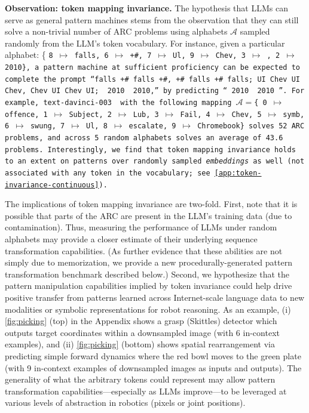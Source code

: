 \textbf{Observation: token mapping invariance.} The hypothesis that LLMs can serve as general pattern machines stems from the observation that they can still solve a non-trivial number of ARC problems using alphabets $\mathcal{A}$ sampled randomly from the LLM's token vocabulary. For instance, given a particular alphabet: 
\{
\tt{8} $\mapsto$ \tt{falls},
\tt{6} $\mapsto$ \tt{+\#},
\tt{7} $\mapsto$ \tt{Ul},
\tt{9} $\mapsto$ \tt{Chev},
\tt{3} $\mapsto$ \ch,
\tt{2} $\mapsto$ \tt{2010}\},
a pattern machine at sufficient proficiency can be expected to complete the prompt
``\tt{falls +\# falls +\#, +\# falls +\# falls; UI Chev UI Chev, Chev UI Chev UI; }\ch\tt{ 2010 }\ch\tt{ 2010,}''
by predicting
``\tt{ 2010 }\ch\tt{ 2010 }\ch''.
For example, text-davinci-003 \cite{ouyang2022training,brown2020language} with the following mapping
$\mathcal{A}=$\{
\tt{0} $\mapsto$ \tt{offence},
\tt{1} $\mapsto$ \tt{Subject},
\tt{2} $\mapsto$ \tt{Lub},
\tt{3} $\mapsto$ \tt{Fail},
\tt{4} $\mapsto$ \tt{Chev},
\tt{5} $\mapsto$ \tt{symb},
\tt{6} $\mapsto$ \tt{swung},
\tt{7} $\mapsto$ \tt{Ul},
\tt{8} $\mapsto$ \tt{escalate},
\tt{9} $\mapsto$ \tt{Chromebook}\}
solves 52 ARC problems, and across 5 random alphabets solves an average of 43.6 problems. Interestingly, we find that token mapping invariance holds to an extent on patterns over randomly sampled \textit{embeddings} as well (not associated with any token in the vocabulary; see \cref{app:token-invariance-continuous}).

The implications of token mapping invariance are two-fold.
First, note that it is possible that parts of the ARC are present in the LLM's training data (\ie due to contamination).
Thus, measuring the performance of LLMs under random alphabets may provide a closer estimate of their underlying sequence transformation capabilities. (As further evidence that these abilities are not simply due to memorization, we provide a new procedurally-generated pattern transformation benchmark described below.)
Second, we hypothesize that the pattern manipulation capabilities implied by token invariance could help drive positive transfer from patterns learned across Internet-scale language data to new modalities or symbolic representations for robot reasoning.
As an example, (i) \cref{fig:picking} (top) in the Appendix shows a grasp (Skittles) detector which outputs target coordinates within a downsampled image (with 6 in-context examples), and (ii) \cref{fig:picking} (bottom) shows spatial rearrangement via predicting simple forward dynamics where the red bowl moves to the green plate (with 9 in-context examples of downsampled images as inputs and outputs). 
The generality of what the arbitrary tokens could represent may allow pattern transformation capabilities---especially as LLMs improve---to be leveraged at various levels of abstraction in robotics (\eg pixels or joint positions). %


